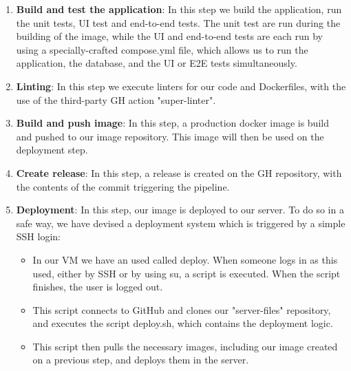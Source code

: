 \begin{enumerate}
	\item \textbf{Build and test the application}: In this step we build the application, run the unit tests, UI test and end-to-end tests. The unit test are run during the building of the image, while the UI and end-to-end tests are each run by using a specially-crafted compose.yml file, which allows us to run the application, the database, and the UI or E2E tests simultaneously. %
	\item \textbf{Linting}: In this step we execute linters for our code and Dockerfiles, with the use of the third-party GH action "super-linter". %
	\item \textbf{Build and push image}: In this step, a production docker image is build and pushed to our image repository. This image will then be used on the deployment step. %
	\item \textbf{Create release}: In this step, a release is created on the GH repository, with the contents of the commit triggering the pipeline. %
	\item \textbf{Deployment}: In this step, our image is deployed to our server. To do so in a safe way, we have devised a deployment system which is triggered by a simple SSH login:
	\begin{itemize}
		\item In our VM we have an used called deploy. When someone logs in as this used, either by SSH or by using su, a script is executed. %
      When the script finishes, the user is logged out.
		\item This script connects to GitHub and clones our "server-files" repository, and executes the script deploy.sh, which contains the deployment logic.
		\item This script then pulls the necessary images, including our image created on a previous step, and deploys them in the server. %

\end{itemize}
\end{enumerate}
